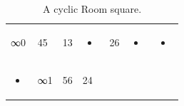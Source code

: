 \documentclass[
  11pt,
  a4paper]{book}
\begin{document}
\begin{longtable}[]{@{}lllllll@{}}
\caption{\label{tab:cyclic-room} A cyclic Room square.}\tabularnewline
\toprule
\endhead
\begin{minipage}[t]{0.06\columnwidth}\raggedright
∞0\strut
\end{minipage} & \begin{minipage}[t]{0.06\columnwidth}\raggedright
45\strut
\end{minipage} & \begin{minipage}[t]{0.06\columnwidth}\raggedright
13\strut
\end{minipage} & \begin{minipage}[t]{0.06\columnwidth}\raggedright
\begin{itemize}
\item
\end{itemize}\strut
\end{minipage} & \begin{minipage}[t]{0.06\columnwidth}\raggedright
26\strut
\end{minipage} & \begin{minipage}[t]{0.06\columnwidth}\raggedright
\begin{itemize}
\item
\end{itemize}\strut
\end{minipage} & \begin{minipage}[t]{0.06\columnwidth}\raggedright
\begin{itemize}
\item
\end{itemize}\strut
\end{minipage}\tabularnewline
\begin{minipage}[t]{0.06\columnwidth}\raggedright
\begin{itemize}
\item
\end{itemize}\strut
\end{minipage} & \begin{minipage}[t]{0.06\columnwidth}\raggedright
∞1\strut
\end{minipage} & \begin{minipage}[t]{0.06\columnwidth}\raggedright
56\strut
\end{minipage} & \begin{minipage}[t]{0.06\columnwidth}\raggedright
24\strut
\end{minipage} & \begin{minipage}[t]{0.06\columnwidth}\raggedright
\begin{itemize}

\end{itemize}
\end{minipage}
\end{longtable}
\end{document}
